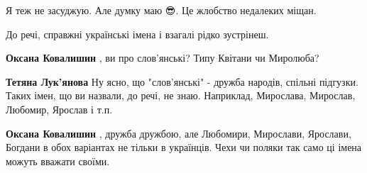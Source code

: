 \begin{itemize}
 
Я теж не засуджую. Але думку маю 😎. Це жлобство недалеких міщан. \Smiley[1.0][yellow]

 
До речі, справжні українські імена і взагалі рідко зустрінеш.

\begin{itemize}
 
\textbf{Оксана Ковалишин} , ви про слов'янські? Типу Квітани чи Миролюба?

 
\textbf{Тетяна Лук'янова} Ну ясно, що "слов'янські" - дружба народів, спільні
підгузки. Таких імен, що ви назвали, до речі, не знаю. Наприклад, Мирослава,
Мирослав, Любомир, Ярослав і т.п.

 
\textbf{Оксана Ковалишин} , дружба дружбою, але Любомири, Мирослави, Ярослави,
Богдани в обох варіантах не тільки в українців. Чехи чи поляки так само ці
імена можуть вважати своїми.

 

\end{itemize}
\end{itemize}
